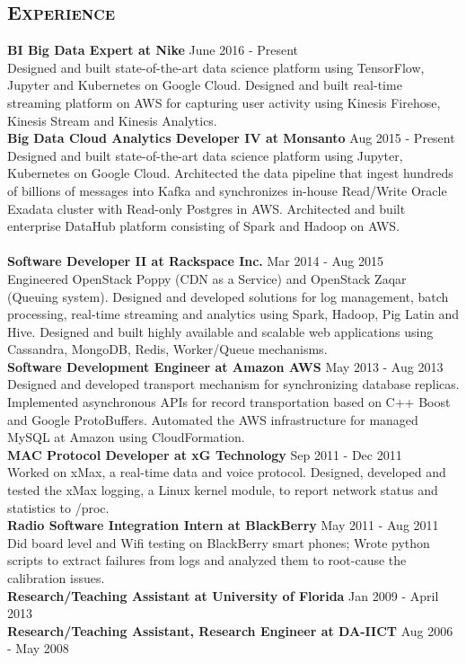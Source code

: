 \begin{resume}
\section{\textsc{Experience}}
\textbf{BI Big Data Expert at Nike} \hfill June 2016 - Present\\
Designed and built state-of-the-art data science platform using TensorFlow, Jupyter and Kubernetes on Google Cloud. Designed and built real-time streaming platform on AWS for capturing user activity using Kinesis Firehose, Kinesis Stream and Kinesis Analytics.\\
\textbf{Big Data Cloud Analytics Developer IV at Monsanto} \hfill Aug 2015 - Present\\
Designed and built state-of-the-art data science platform using Jupyter, Kubernetes on Google Cloud. Architected the data pipeline that ingest hundreds of billions of messages into Kafka and synchronizes in-house Read/Write Oracle Exadata cluster with Read-only Postgres in AWS. Architected and built enterprise DataHub platform consisting of Spark and Hadoop on AWS.\\ \\
\textbf{Software Developer II at Rackspace Inc.} \hfill Mar 2014 - Aug 2015\\
Engineered OpenStack Poppy (CDN as a Service) and OpenStack Zaqar (Queuing system). Designed and developed solutions for log management, batch processing, real-time streaming and analytics using Spark, Hadoop, Pig Latin and Hive. Designed and built highly available and scalable web applications using Cassandra, MongoDB, Redis, Worker/Queue mechanisms.\\
\textbf{Software Development Engineer at Amazon AWS} \hfill May 2013 - Aug 2013\\
Designed and developed transport mechanism for synchronizing database replicas. Implemented asynchronous APIs for record transportation based on C++ Boost and Google ProtoBuffers. Automated the AWS infrastructure for managed MySQL at Amazon using CloudFormation.\\
\textbf{MAC Protocol Developer at xG Technology} \hfill Sep 2011 - Dec 2011\\
Worked on xMax, a real-time data and voice protocol. Designed, developed and tested the xMax logging, a Linux kernel module, to report network status and statistics to /proc.\\
\textbf{Radio Software Integration Intern at BlackBerry} \hfill May 2011 - Aug 2011\\
Did board level and Wifi testing on BlackBerry smart phones; Wrote python scripts to extract failures from logs and analyzed them to root-cause the calibration issues.\\
\textbf{Research/Teaching Assistant at University of Florida} \hfill Jan 2009 - April 2013\\
\textbf{Research/Teaching Assistant, Research Engineer at DA-IICT} \hfill Aug 2006 - May 2008 \\


\end{resume}
